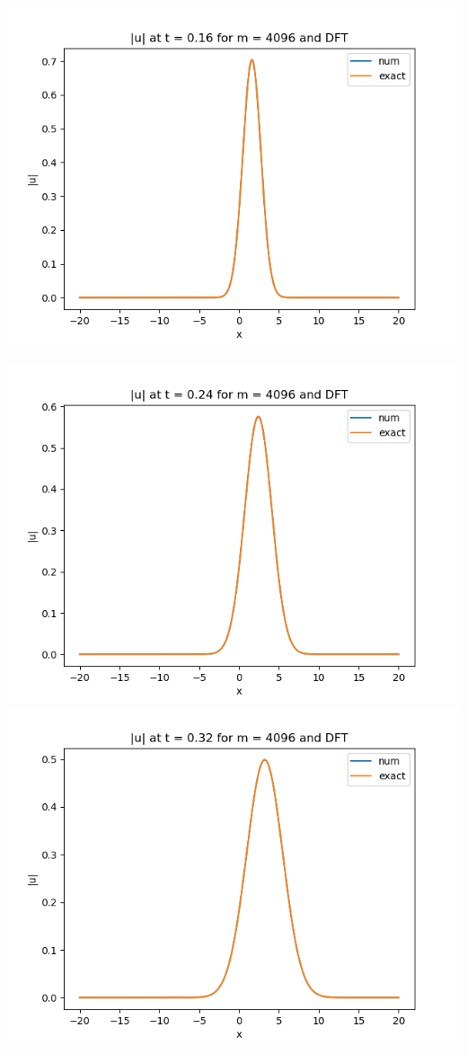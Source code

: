 \documentclass{article}
\begin{document}
\begin{enumerate}[label=(\alph*)]
\begin{center}
	\includegraphics[scale=.3]{FINAL u_abs t = 0.16 m = 4096 DFT}
\end{center}
\begin{center}
	\includegraphics[scale=.3]{FINAL u_abs t = 0.24 m = 4096 DFT}
	\includegraphics[scale=.3]{FINAL u_abs t = 0.32 m = 4096 DFT}

\end{center}
\end{enumerate}
\end{document}
